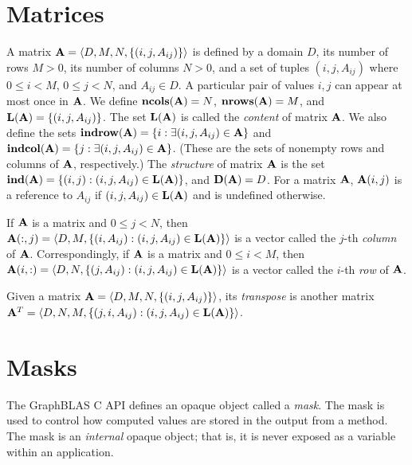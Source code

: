\section{Matrices}
\label{Sec:Matrices}

A matrix ${\bf A} = \langle D, M, N, \{ (i,j,A_{ij}) \} \rangle$ is
defined by a domain $D$, its number of rows $M>0$, its number of columns
$N>0$, and a set of tuples $(i,j,A_{ij})$ where $0 \leq i < M$, $0 \leq
j < N$, and $A_{ij} \in D$. A particular pair of values $i,j$ can
appear at most once in ${\bf A}$. We define $\mathbf{ncols}({\bf A})
= N$,  $\mathbf{nrows}({\bf A}) = M$, and $\mathbf{L}({\bf A}) =
\{ (i,j,A_{ij}) \}$.  The set $\mathbf{L}({\bf A})$ is called the
\emph{content} of matrix ${\bf A}$.  We also define the sets
${\bf indrow({\bf A})} = \{ i : \exists (i,j,A_{ij}) \in
{\bf A} \}$ and ${\bf indcol({\bf A})} = \{ j : \exists
(i,j,A_{ij}) \in {\bf A} \}$.  (These are the sets of nonempty
rows and columns of ${\bf A}$, respectively.)  The \emph{structure}
of matrix ${\bf A}$ is the set $\mathbf{ind}({\bf A}) = \{ (i,j) :
(i,j,A_{ij}) \in \mathbf{L}({\bf A}) \}$, and $\mathbf{D}({\bf A}) = D$.
For a matrix ${\bf A}$, ${\bf A}(i,j)$ is a reference to $A_{ij}$
if $(i,j,A_{ij}) \in \mathbf{L}({\bf A})$ and is undefined otherwise.

If ${\bf A}$ is a matrix and $0 \leq j < N$, then ${\bf A}(:,j)
= \langle D, M, \{(i,A_{ij}) : (i,j,A_{ij}) \in \mathbf{L}({\bf A})
\} \rangle$ is a vector called the $j$-th \emph{column}
of ${\bf A}$. Correspondingly, if ${\bf A}$ is a matrix and
$0 \leq i < M$, then ${\bf A}(i,:) = \langle D, N, \{(j,A_{ij}) :
(i,j,A_{ij}) \in \mathbf{L}({\bf A}) \} \rangle$ is a vector called
the $i$-th \emph{row} of ${\bf A}$.

Given a matrix ${\bf A} = \langle D, M, N, \{ (i,j,A_{ij}) \} \rangle$,
its \emph{transpose} is another matrix ${\bf A}^T = \langle D, N, M, \{
(j,i,A_{ij}) : (i,j,A_{ij}) \in \mathbf{L}({\bf A}) \} \rangle$.

\section{Masks}
\label{Sec:Masks}

The GraphBLAS C API defines an opaque object called a \emph{mask}.  The mask
is used to control how computed values are stored in the output from a method. 
The mask is an \emph{internal} opaque object; that is, it is never exposed as a variable
within an application. 

